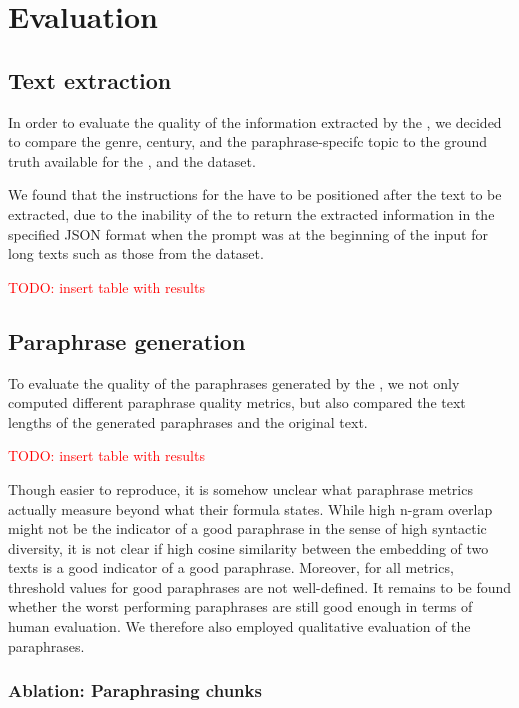 \chapter{Evaluation}
\label{chap:evaluation}

\section{Text extraction}
\label{sec:text_extraction}

In order to evaluate the quality of the information extracted by the \pextractor{}, 
we decided to compare the genre, century, and the paraphrase-specifc topic to the 
ground truth available for the \dataBlog{}, \dataGutenberg{} and the \dataCustom{} dataset.

We found that the instructions for the \pextractor{} have to be positioned after the text to be extracted, 
due to the inability of the \pextractor{} to return the extracted information in the specified JSON format 
when the prompt was at the beginning of the input for long texts such as those from the \dataGutenberg{} dataset.

\textcolor{red}{TODO: insert table with results}

\section{Paraphrase generation}
\label{sec:paraphrase_generation}
To evaluate the quality of the paraphrases generated by the \pgenerator{}, 
we not only computed different paraphrase quality metrics, 
but also compared the text lengths of the generated paraphrases and the original text.

\textcolor{red}{TODO: insert table with results}

Though easier to reproduce, it is somehow unclear what paraphrase metrics actually measure beyond what their formula states.
While high n-gram overlap might not be the indicator of a good paraphrase in the sense of high syntactic diversity, 
it is not clear if high cosine similarity between the embedding of two texts is a good indicator of a good paraphrase.
Moreover, for all metrics, threshold values for good paraphrases are not well-defined.
It remains to be found whether the worst performing paraphrases are still good enough in terms of human evaluation.
We therefore also employed qualitative evaluation of the paraphrases.


\subsection{Ablation: Paraphrasing chunks}
\label{subsec:paraphrasing_chunks}

